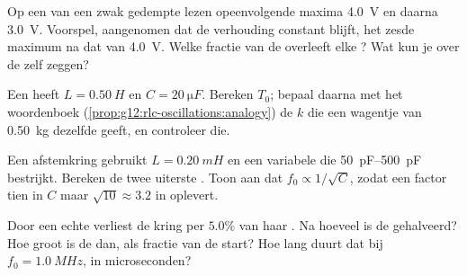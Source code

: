 \begin{exercise}[$\star\star$]\label{exo:g12:rlc-oscillations:10}
Op een  van een zwak gedempte  lezen opeenvolgende maxima
\qty{4.0}{V} en daarna \qty{3.0}{V}. Voorspel, aangenomen dat de verhouding
constant blijft, het zesde maximum na dat van \qty{4.0}{V}. Welke fractie van
de \emph{} overleeft elke ? Wat kun je over de
 zelf zeggen?
\end{exercise}

\begin{exercise}[$\star\star$]\label{exo:g12:rlc-oscillations:11}
Een  heeft $L = \qty{0.50}{H}$ en $C = \qty{20}{\micro F}$. Bereken
$T_0$; bepaal daarna met het woordenboek
(\cref{prop:g12:rlc-oscillations:analogy}) de  $k$ die een
wagentje van \qty{0.50}{kg} dezelfde  geeft, en controleer die.
\end{exercise}

\begin{exercise}[$\star\star\star$]\label{exo:g12:rlc-oscillations:12}
Een afstemkring gebruikt $L = \qty{0.20}{mH}$ en een variabele  die
\qtyrange{50}{500}{pF} bestrijkt. Bereken de twee uiterste . Toon
aan dat $f_0 \propto 1/\sqrt{C}$, zodat een factor tien in $C$ maar
$\sqrt{10} \approx 3.2$ in  oplevert.
\end{exercise}

\begin{exercise}[$\star\star\star$]\label{exo:g12:rlc-oscillations:13}
Door een echte  verliest de kring per  $5.0\%$ van haar
. Na hoeveel  is de  gehalveerd? Hoe groot is de
 dan, als fractie van de start? Hoe lang duurt dat bij
$f_0 = \qty{1.0}{MHz}$, in microseconden?
\end{exercise}

